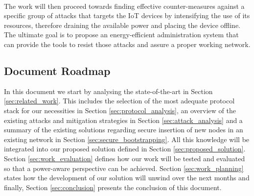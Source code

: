 \paragraph{}
The work will then proceed towards finding effective counter-measures against a specific group of attacks that targets the \gls{IoT} devices by intensifying the use of its resources, therefore draining the available power and placing the device offline. The ultimate goal is to propose an energy-efficient administration system that can provide the tools to resist those attacks and assure a proper working network.

\subsection{Document Roadmap}

In this document we start by analysing the state-of-the-art in Section \ref{sec:related_work}. This includes the selection of the most adequate protocol stack for our necessities in Section \ref{sec:protocol_analysis}, an overview of the existing attacks and mitigation strategies in Section \ref{sec:attack_analysis} and a summary of the existing solutions regarding secure insertion of new nodes in an existing network in Section \ref{sec:secure_bootstrapping}. All this knowledge will be integrated into our proposed solution defined in Section \ref{sec:proposed_solution}. Section \ref{sec:work_evaluation} defines how our work will be tested and evaluated so that a power-aware perspective can be achieved. Section \ref{sec:work_planning} states how the development of our solution will unwind over the next months and finally, Section \ref{sec:conclusion} presents the conclusion of this document.